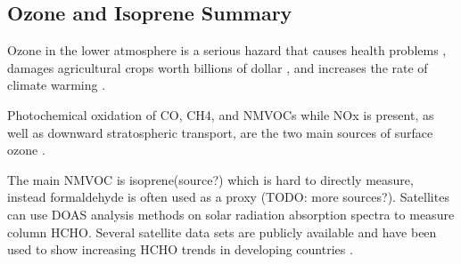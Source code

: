 \subsection{Ozone and Isoprene Summary}
Ozone in the lower atmosphere is a serious hazard that causes health problems \cite{Hsieh_2013}, damages agricultural crops worth billions of dollar \cite{Avnery_2011}, and increases the rate of climate warming \cite{IPCC_2013_chap8}.
  
Photochemical oxidation of CO, CH4, and NMVOCs while NOx is present, as well as downward stratospheric transport, are the two main sources of surface ozone \cite{Mahajan_2015}.

The main NMVOC is isoprene(source?) which is hard to directly measure, instead formaldehyde is often used as a proxy \cite{Marais_2012}(TODO: more sources?). 
Satellites can use DOAS analysis methods on solar radiation absorption spectra to measure column HCHO.
Several satellite data sets are publicly available and have been used to show increasing HCHO trends in developing countries \cite{Mahajan_2015}.